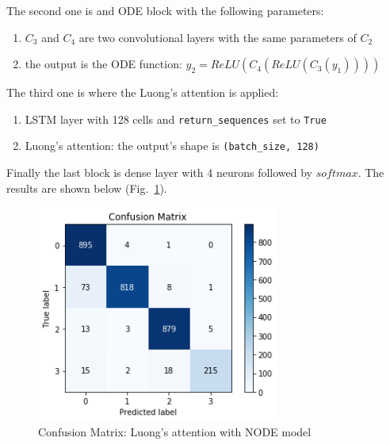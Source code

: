 \documentclass[LaM,binding=0.6cm]{sapthesis}
\begin{document}
The second one is and ODE block with the following parameters:
\begin{enumerate}
\item $C_3$ and $C_4$ are two convolutional layers with the same parameters of $C_2$
\item the output is the ODE function: $y_2=ReLU(C_4(ReLU(C_3(y_1))))$
\end{enumerate}
The third one is where the Luong's attention is applied:
\begin{enumerate}
\item LSTM layer with 128 cells and \texttt{return\_sequences} set to \texttt{True}
\item Luong's attention: the output's shape is \texttt{(batch\_size, 128)} 
\end{enumerate}
Finally the last block is dense layer with 4 neurons followed by $softmax$.
The results are shown below (Fig.~\ref{fig:lstmat3}).
\begin{figure}  \centering
    \includegraphics[width=80mm,scale=0.7]{lstmat3}
    \caption{Confusion Matrix: Luong's attention with NODE model}
    \label{fig:lstmat3}
\end{figure}
\end{document}
